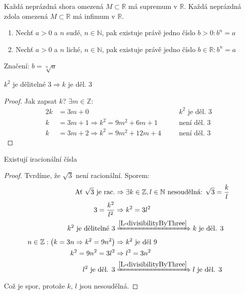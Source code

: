 \begin{definitionAi}\label{D-A3}
	Každá neprázdná shora omezená $M\subset\mathbb{R}$ má supremum v $\mathbb{R}$.
	Každá neprázdná zdola omezená $M\subset\mathbb{R}$ má infimum v $\mathbb{R}$.
\end{definitionAi}

\begin{definition}[Odmocnina]\noindent\label{D-sqrt}
	\begin{enumerate}
		\item Nechť $a>0$ a $n$ sudé, $n\in\mathbb{N}$, pak existuje právě jedno číslo $b>0: b^n=a$
		\item Nechť $a>0$ a $n$ liché, $n\in\mathbb{N}$, pak existuje právě jedno číslo $b\in\mathbb{R}: b^n=a$
	\end{enumerate}
	Značení: $b=\sqrt[n]{a}$
\end{definition}

\begin{lemmaAlph}\label{L-divisibilityByThree}
	$k^2 \text{ je dělitelné }3\Rightarrow k \text{ je děl. }3$
\end{lemmaAlph}
\begin{proof}
	Jak zapsat $k$? $\exists m\in\mathbb{Z}:$
	\begin{alignat}{2}
		k &= 3m+0 &&k^2\text{ je děl. $3$}\\
		k &= 3m+1 \Rightarrow k^2=9m^2+6m+1 \quad&&\text{není děl. $3$} \\
		k &= 3m+2 \Rightarrow k^2=9m^2+12m+4 \quad&&\text{není děl. $3$}
	\end{alignat}
\end{proof}

\begin{theorem}
	Existují iracionální čísla
\end{theorem}
\begin{proof}
	Tvrdíme, že $\sqrt{3}$ není racionální. Sporem:
	\begin{alignat}{1}
		\text{Ať $\sqrt{3}$ je rac.} &\Rightarrow\exists k\in\mathbb{Z}, l\in\mathbb{N}
			\text{ nesoudělná: }\sqrt{3}=\frac{k}{l} \\
		3=\frac{k^2}{l^2} &\Rightarrow k^2=3l^2 \\
		k^2 \text{ je dělitelné }3 &\xRightarrow{\autoref{L-divisibilityByThree}} k\text{ je děl. }3 \\
		n\in\mathbb{Z}: \left(k=3n\Rightarrow k^2=9n^2\right) &\Rightarrow k^2 \text{ je děl }9 \\
		k^2=9n^2=3l^2 &\Rightarrow l^2=3n^2 \\
		l^2 \text{ je děl. }3 &\xRightarrow{\autoref{L-divisibilityByThree}} l\text{ je děl. }3
	\end{alignat}
	Což je spor, protože $k$, $l$ jsou nesoudělná.
\end{proof}

